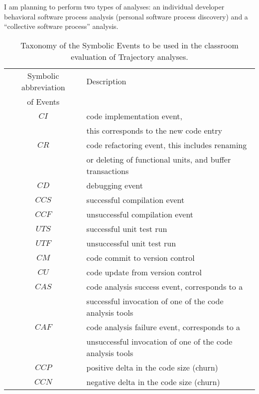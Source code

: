 I am planning to perform two types of analyses: an individual developer behavioral software process analysis (personal software process discovery) and a ``collective software process'' analysis.

\begin{table}
\begin{center}
    \begin{tabular}{ | c | l | }
    \hline
    Symbolic abbreviation & Description \\ 
     of Events 						& 	  \\ 
    \hline
    $CI$                  & code implementation event, \\
    											& this corresponds to the new code entry \\
    \hline    											
    $CR$                  & code refactoring event, this includes renaming \\
    											& or deleting of functional units, and buffer transactions \\
    \hline
    $CD$                  & debugging event \\
		\hline
		$CCS$                 & successful compilation event \\
		\hline
		$CCF$                 & unsuccessful compilation event \\
    \hline
		$UTS$                 & successful unit test run \\
		\hline
		$UTF$                 & unsuccessful unit test run \\
		\hline
		$CM$                  & code commit to version control \\
		\hline
		$CU$                  & code update from version control \\
		\hline
    $CAS$                 & code analysis success event, corresponds to a \\
                          & successful invocation of one of the code analysis tools \\
    \hline
		$CAF$                 & code analysis failure event, corresponds to a \\
                          & unsuccessful invocation of one of the code analysis tools \\
    \hline    
    $CCP$                 & positive delta in the code size (churn) \\
    \hline
    $CCN$                 & negative delta in the code size (churn) \\
    \hline
    \end{tabular}
    \caption{Taxonomy of the Symbolic Events to be used in the classroom evaluation of Trajectory analyses.}
    \label{fig:data_collected_points}
    \end{center}
\end{table}

